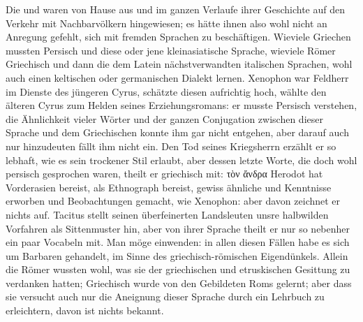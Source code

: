 \label{sp.20}
\label{I.IV.grci}

Die  und  waren von Hause aus und im ganzen Verlaufe ihrer Geschichte auf den Verkehr mit Nachbarvölkern hingewiesen; es hätte ihnen also wohl nicht an Anregung gefehlt, sich mit fremden Sprachen zu beschäftigen. Wieviele Griechen mussten Persisch und diese oder jene kleinasiatische Sprache, wieviele Römer Griechisch und dann die dem Latein nächstverwandten italischen Sprachen, wohl auch einen keltischen oder germanischen Dialekt lernen. Xenophon war Feldherr im Dienste des jüngeren Cyrus, schätzte diesen aufrichtig hoch, wählte den älteren Cyrus zum Helden seines Erziehungsromans: er musste Persisch verstehen, die Ähnlichkeit vieler Wörter und der ganzen Conju\-\label{fp.19}gation zwischen dieser Sprache und dem Griechischen konnte ihm gar nicht entgehen, aber darauf auch nur hinzudeuten fällt ihm nicht ein. Den Tod seines Kriegsherrn erzählt er so lebhaft, wie es sein trockener Stil erlaubt, aber dessen letzte Worte, die doch wohl persisch gesprochen waren, theilt er griechisch mit: τὸν ἄνδρα  Herodot hat Vorderasien bereist, als Ethnograph bereist, gewiss ähnliche und  Kenntnisse erworben und Beobachtungen gemacht, wie Xenophon: aber davon zeichnet er nichts auf. Tacitus stellt seinen überfeinerten Landsleuten unsre halbwilden Vorfahren als Sittenmuster hin, aber von ihrer Sprache theilt er nur so nebenher ein paar Vocabeln mit. Man möge einwenden: in allen diesen Fällen habe es sich um Barbaren gehandelt, im Sinne des griechisch-römischen Eigendünkels. Allein die Römer wussten wohl, was sie der griechischen und etruskischen Gesittung zu verdanken hatten; Griechisch wurde von den Gebildeten Roms gelernt; aber dass sie versucht  auch nur die Aneignung dieser Sprache durch ein Lehrbuch zu erleichtern, davon ist nichts bekannt.

